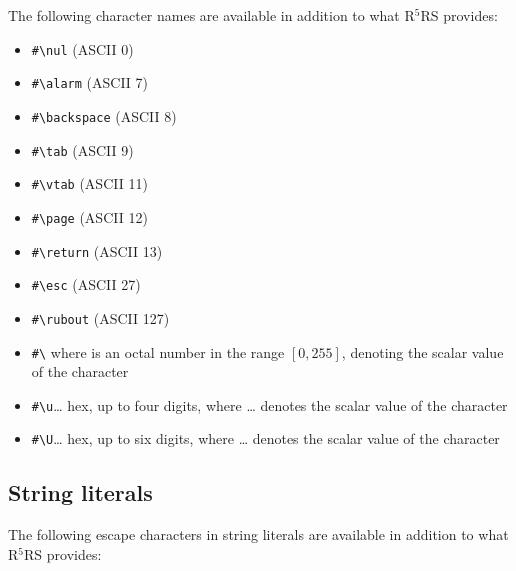 The following character names are available in addition to what
R$^5$RS provides:
%
\begin{itemize}
\item \verb|#\nul| (ASCII 0) 
\item \verb|#\alarm| (ASCII 7) 
\item \verb|#\backspace| (ASCII 8) 
\item \verb|#\tab| (ASCII 9) 
\item \verb|#\vtab| (ASCII 11) 
\item \verb|#\page| (ASCII 12) 
\item \verb|#\return| (ASCII 13) 
\item \verb|#\esc| (ASCII 27) 
\item \verb|#\rubout| (ASCII 127) 
\item \verb|#\| where
 is an octal number in the range
$\left[0,255\right]$, denoting the scalar value of the character
\item \verb|#\u|\ldots{} hex, up to four digits,
  where \ldots{} denotes the scalar value of the character
\item \verb|#\U|\ldots{} hex, up to six digits,
  where \ldots{} denotes the scalar value of the character
\end{itemize}

\subsection{String literals}

The following escape characters in string literals are available in addition to what
R$^5$RS provides:

